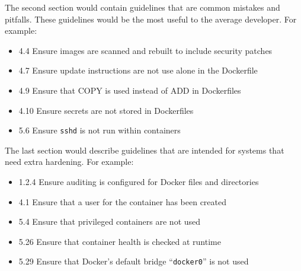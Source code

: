 \hfill

The second section would contain guidelines that are common mistakes and pitfalls. These guidelines would be the most useful to the average developer. For example:
\begin{itemize}
    \item 4.4 Ensure images are scanned and rebuilt to include security patches
    \item 4.7 Ensure update instructions are not use alone in the Dockerfile
    \item 4.9 Ensure that COPY is used instead of ADD in Dockerfiles
    \item 4.10 Ensure secrets are not stored in Dockerfiles
    \item 5.6 Ensure \lstinline{sshd} is not run within containers
\end{itemize}

\hfill

The last section would describe guidelines that are intended for systems that need extra hardening. For example:
\begin{itemize}
    \item 1.2.4 Ensure auditing is configured for Docker files and directories
    \item 4.1 Ensure that a user for the container has been created
    \item 5.4 Ensure that privileged containers are not used
    \item 5.26 Ensure that container health is checked at runtime
    \item 5.29 Ensure that Docker's default bridge ``\lstinline{docker0}'' is not used
\end{itemize}
